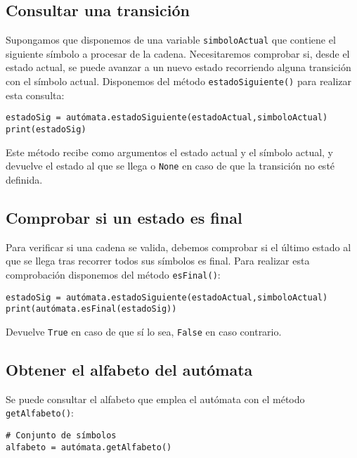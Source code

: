 \subsection{Consultar una transición}

Supongamos que disponemos de una variable \texttt{simboloActual} que contiene el siguiente símbolo a procesar de la cadena. Necesitaremos comprobar si, desde el estado actual, se puede avanzar a un nuevo estado recorriendo alguna transición con el símbolo actual. Disponemos del método \texttt{estadoSiguiente()} para realizar esta consulta:

\begin{lstlisting}
estadoSig = autómata.estadoSiguiente(estadoActual,simboloActual)
print(estadoSig)
\end{lstlisting}

Este método recibe como argumentos el estado actual y el símbolo actual, y devuelve el estado al que se llega o \texttt{None} en caso de que la transición no esté definida.

\subsection{Comprobar si un estado es final}

Para verificar si una cadena se valida, debemos comprobar si el último estado al que se llega tras recorrer todos sus símbolos es final. Para realizar esta comprobación disponemos del método \texttt{esFinal()}:

\begin{lstlisting}
estadoSig = autómata.estadoSiguiente(estadoActual,simboloActual)
print(autómata.esFinal(estadoSig))
\end{lstlisting}

Devuelve \texttt{True} en caso de que sí lo sea, \texttt{False} en caso contrario.

\subsection{Obtener el alfabeto del autómata}

Se puede consultar el alfabeto que emplea el autómata con el método \texttt{getAlfabeto()}:
\begin{lstlisting}
# Conjunto de símbolos
alfabeto = autómata.getAlfabeto()
\end{lstlisting}